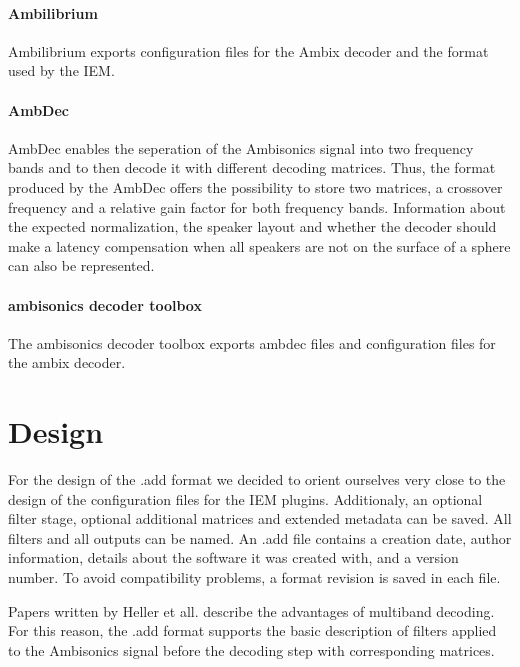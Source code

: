 \documentclass[a4paper, 10pt, twocolumn]{article}
\begin{document}
\paragraph{Ambilibrium}

Ambilibrium \cite{romanov2018ambilibrium} exports configuration files for the Ambix decoder and the format used by the IEM.

\paragraph{AmbDec}

AmbDec \cite{AmbDecManual} enables the seperation of the Ambisonics signal into two frequency bands and to then decode it with different decoding matrices. Thus, the format produced by the AmbDec offers the possibility to store two matrices, a crossover frequency and a relative gain factor for both frequency bands. Information about the expected normalization, the speaker layout and whether the decoder should make a latency compensation when all speakers are not on the surface of a sphere can also be represented.

\paragraph{ambisonics decoder toolbox}

The ambisonics decoder toolbox \cite{adtpaper} exports ambdec files and configuration files for the ambix decoder. 


\section{Design} \label{sec:Design}

For the design of the .add format we decided to orient ourselves very close to the design of the configuration files for the IEM plugins. Additionaly, an optional filter stage, optional additional matrices and extended metadata can be saved. All filters and all outputs can be named. An .add file contains a creation date, author information, details about the software it was created with, and a version number. To avoid compatibility problems, a format revision is saved in each file. 

Papers written by Heller et all. \cite{heller2008is, ambifilters} describe the advantages of multiband decoding. For this reason, the .add format supports the basic description of filters applied to the Ambisonics signal before the decoding step with corresponding matrices.
\end{document}
